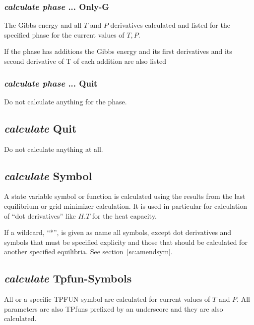 \documentclass[11pt]{article}
\begin{document}
\hypertarget{calculate phase ... only-G}{}
\subsubsection{{\em calculate phase} ... Only-G}

The Gibbs energy and all $T$ and $P$ derivatives calculated and listed for
the specified phase for the current values of $T,P$.

If the phase has additions the Gibbs energy and its first derivatives
and its second derivative of T of each addition are also listed

\hypertarget{Calculate phase ... quit}{}
\subsubsection{{\em calculate phase} ... Quit}

Do not calculate anything for the phase.

\hypertarget{Calculate quit}{}
\subsection{{\em calculate} Quit}

Do not calculate anything at all.

\hypertarget{Calculate symbol}{}
\subsection{{\em calculate} Symbol}

A state variable symbol or function is calculated using the results
from the last equilibrium or grid minimizer calculation.  It is used
in particular for calculation of ``dot derivatives'' like $H.T$ for
the heat capacity.

If a wildcard, ``*'', is given as name all symbols, except dot
derivatives and symbols that must be specified explicity and those
that should be calculated for another specified equilibria.  See
section~\ref{sc:amendsym}.


\hypertarget{Calculate TPfun}{}
\subsection{{\em calculate} Tpfun-Symbols}

All or a specific TPFUN symbol are calculated for current values of
$T$ and $P$.  All parameters are also TPfuns prefixed by an underscore
and they are also calculated.
\end{document}
